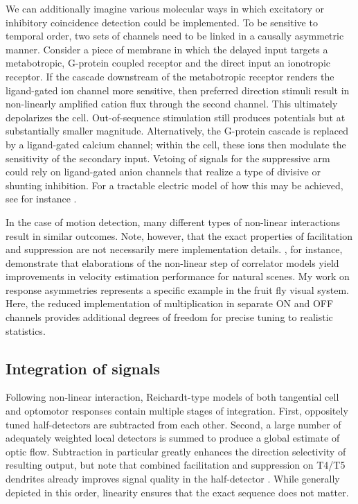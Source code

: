 We can additionally imagine various molecular ways in which excitatory or inhibitory coincidence detection could be implemented. To be sensitive to temporal order, two sets of channels need to be linked in a causally asymmetric manner. Consider a piece of membrane in which the delayed input targets a metabotropic, G-protein coupled receptor and the direct input an ionotropic receptor. If the cascade downstream of the metabotropic receptor renders the ligand-gated ion channel more sensitive, then preferred direction stimuli result in non-linearly amplified cation flux through the second channel. This ultimately depolarizes the cell. Out-of-sequence stimulation still produces potentials but at substantially smaller magnitude. Alternatively, the G-protein cascade is replaced by a ligand-gated calcium channel; within the cell, these ions then modulate the sensitivity of the secondary input. Vetoing of signals for the suppressive arm could rely on ligand-gated anion channels that realize a type of divisive or shunting inhibition. For a tractable electric model of how this may be achieved, see for instance \citet{Torre:1978vp}.

In the case of motion detection, many different types of non-linear interactions result in similar outcomes. Note, however, that the exact properties of facilitation and suppression are not necessarily mere implementation details. \citet{Fitzgerald:2015aa}, for instance, demonstrate that elaborations of the non-linear step of correlator models yield improvements in velocity estimation performance for natural scenes. My work on response asymmetries represents a specific example in the fruit fly visual system. Here, the reduced implementation of multiplication in separate ON and OFF channels provides additional degrees of freedom for precise tuning to realistic statistics.

\subsection{Integration of signals}
Following non-linear interaction, Reichardt-type models of both tangential cell and optomotor responses contain multiple stages of integration. First, oppositely tuned half-detectors are subtracted from each other. Second, a large number of adequately weighted local detectors is summed to produce a global estimate of optic flow. Subtraction in particular greatly enhances the direction selectivity of resulting output, but note that combined facilitation and suppression on T4/T5 dendrites already improves signal quality in the half-detector \citep{Borst:1990wu,Haag:2016cq}. While generally depicted in this order, linearity ensures that the exact sequence does not matter.


